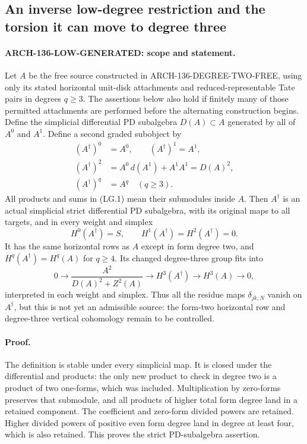 \subsection{An inverse low-degree restriction and the torsion it can move to degree three}
\label{arch136:low-generated-inverse}

\paragraph{ARCH-136-LOW-GENERATED: scope and statement.}
Let \(A\) be the free source constructed in
ARCH-136-DEGREE-TWO-FREE, using only its stated horizontal unit-disk
attachments and reduced-representable Tate pairs in degrees
\(q\geq3\). The assertions below also hold if finitely many of
those permitted attachments are performed before the alternating
construction begins. Define the simplicial differential PD subalgebra
\(D(A)\subset A\) generated by all of \(A^0\) and \(A^1\).
Define a second graded subobject by
\[
 \begin{split}
 (A^\dagger)^0&=A^0,\qquad (A^\dagger)^1=A^1,\\
 (A^\dagger)^2&=A^0\,d(A^1)+A^1A^1=D(A)^2,\\
 (A^\dagger)^q&=A^q\quad(q\geq3).
 \end{split}
 \tag{LG.1}
\]
All products and sums in (LG.1) mean their submodules inside \(A\).
Then \(A^\dagger\) is an actual simplicial strict differential
PD subalgebra, with its original maps to all targets, and in every
weight and simplex
\[
 H^0(A^\dagger)=S,\qquad H^1(A^\dagger)=H^2(A^\dagger)=0.
 \tag{LG.2}
\]
It has the same horizontal rows as \(A\) except in form degree two,
and \(H^q(A^\dagger)=H^q(A)\) for \(q\geq4\). Its changed
degree-three group fits into
\[
 0\longrightarrow
 \frac{A^2}{D(A)^2+Z^2(A)}
 \longrightarrow H^3(A^\dagger)
 \longrightarrow H^3(A)\longrightarrow0,
 \tag{LG.3}
\]
interpreted in each weight and simplex. Thus all the residue maps
\(\delta_{jk,N}\) vanish on \(A^\dagger\), but this is not yet
an admissible source: the form-two horizontal row and degree-three
vertical cohomology remain to be controlled.

\paragraph{Proof.}
The definition is stable under every simplicial map. It is closed
under the differential and products: the only new product to check
in degree two is a product of two one-forms, which was included.
Multiplication by zero-forms preserves that submodule, and all
products of higher total form degree land in a retained component.
The coefficient and zero-form divided powers are retained. Higher
divided powers of positive even form degree land in degree at least
four, which is also retained. This proves the strict PD-subalgebra
assertion.

